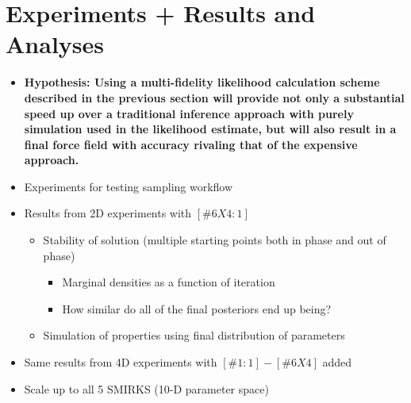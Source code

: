 \documentclass[aps,pre,nofootinbib,superscriptaddress,linenumbers,10pt, draft,tightenlines]{revtex4-1}
\begin{document}
\section{Experiments + Results and Analyses}
\begin{itemize}
	\item \textbf{Hypothesis: Using a multi-fidelity likelihood calculation scheme described in the previous section will provide not only a substantial
	      speed up over a traditional inference approach with purely simulation used in the likelihood estimate, but 
	      will also result in a final force field with accuracy rivaling that of the expensive approach.}
	\item Experiments for testing sampling workflow
        \item Results from 2D experiments with $[\#6X4:1]$
        \begin{itemize}
            \item Stability of solution (multiple starting points both in phase and out of phase)
            \begin{itemize}
                \item Marginal densities as a function of iteration
                \item How similar do all of the final posteriors end up being?
            \end{itemize}
            \item Simulation of properties using final distribution of parameters
        \end{itemize}
        \item Same results from 4D experiments with $[\#1:1]-[\#6X4]$ added
        \item Scale up to all 5 SMIRKS (10-D parameter space)

\end{itemize}
\end{document}
